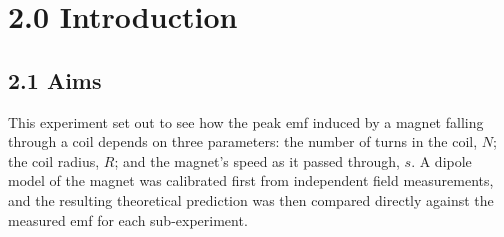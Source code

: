 \documentclass{article}
\begin{document}
\section*{2.0 Introduction}
 
\subsection*{2.1 Aims}
This experiment set out to see how the peak emf induced by a magnet falling through a coil depends on three 
parameters: the number of turns in the coil, $N$; the coil radius, $R$; and the magnet's speed as it passed 
through, $s$. A dipole model of the magnet was calibrated first from independent field measurements, and the 
resulting theoretical prediction was then compared directly against the measured emf for each sub-experiment.
 
\end{document}

